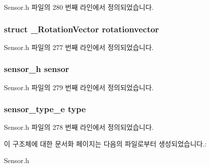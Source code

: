 Sensor.\-h 파일의 280 번째 라인에서 정의되었습니다.

\hypertarget{struct___rotation_vector_extend_a273e40af4ef4690cbb95f7f77b6ef54e}{
\subsubsection[{rotationvector}]{\setlength{\rightskip}{0pt plus 5cm}struct {\bf \-\_\-\-Rotation\-Vector} rotationvector}}\label{struct___rotation_vector_extend_a273e40af4ef4690cbb95f7f77b6ef54e}


Sensor.\-h 파일의 277 번째 라인에서 정의되었습니다.

\hypertarget{struct___rotation_vector_extend_a5bae9b7801bc3808411925cde81d3f26}{
\subsubsection[{sensor}]{\setlength{\rightskip}{0pt plus 5cm}sensor\-\_\-h sensor}}\label{struct___rotation_vector_extend_a5bae9b7801bc3808411925cde81d3f26}


Sensor.\-h 파일의 279 번째 라인에서 정의되었습니다.

\hypertarget{struct___rotation_vector_extend_abffb09766da2fc510a79bb51f82a36e1}{
\subsubsection[{type}]{\setlength{\rightskip}{0pt plus 5cm}sensor\-\_\-type\-\_\-e type}}\label{struct___rotation_vector_extend_abffb09766da2fc510a79bb51f82a36e1}


Sensor.\-h 파일의 278 번째 라인에서 정의되었습니다.



이 구조체에 대한 문서화 페이지는 다음의 파일로부터 생성되었습니다.\-:\begin{DoxyCompactItemize}
\item 
Sensor.\-h\end{DoxyCompactItemize}
